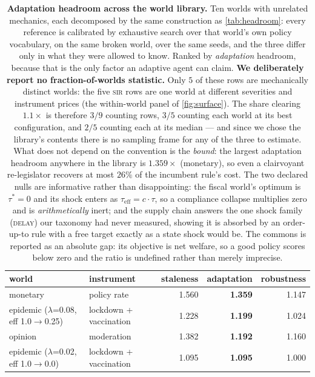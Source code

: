 \begin{table}[t]\centering\small
\caption{\textbf{Adaptation headroom across the world library.} Ten worlds with unrelated mechanics, each decomposed by the same construction as \cref{tab:headroom}: every reference is calibrated by exhaustive search over that world's own policy vocabulary, on the same broken world, over the same seeds, and the three differ only in what they were allowed to know. Ranked by \emph{adaptation} headroom, because that is the only factor an adaptive agent can claim. \textbf{We deliberately report no fraction-of-worlds statistic.} Only $5$ of these rows are mechanically distinct worlds: the five \textsc{sir} rows are one world at different severities and instrument prices (the within-world panel of \cref{fig:surface}). The share clearing $1.1\times$ is therefore $3/9$ counting rows, $3/5$ counting each world at its best configuration, and $2/5$ counting each at its median --- and since we chose the library's contents there is no sampling frame for any of the three to estimate. What does not depend on the convention is the \emph{bound}: the largest adaptation headroom anywhere in the library is $1.359\times$ (monetary), so even a clairvoyant re-legislator recovers at most $26\%$ of the incumbent rule's cost. The two declared nulls are informative rather than disappointing: the fiscal world's optimum is $\tau^\ast=0$ and its shock enters as $\tau_{\text{eff}} = c\cdot\tau$, so a compliance collapse multiplies zero and is \emph{arithmetically} inert; and the supply chain answers the one shock family (\textsc{delay}) our taxonomy had never measured, showing it is absorbed by an order-up-to rule with a free target exactly as a state shock would be. The commons is reported as an absolute gap: its objective is net welfare, so a good policy scores below zero and the ratio is undefined rather than merely imprecise.}
\label{tab:library}
\begin{tabular}{@{}l l r r r@{}}
\toprule
world & instrument & staleness & \textbf{adaptation} & robustness \\
\midrule
monetary & policy rate & 1.560 & \textbf{1.359} & 1.147 \\
epidemic ($\lambda$=0.08, eff 1.0$\to$0.25) & lockdown + vaccination & 1.228 & \textbf{1.199} & 1.024 \\
opinion & moderation & 1.382 & \textbf{1.192} & 1.160 \\
epidemic ($\lambda$=0.02, eff 1.0$\to$0.0) & lockdown + vaccination & 1.095 & \textbf{1.095} & 1.000 \\

\end{tabular}
\end{table}
